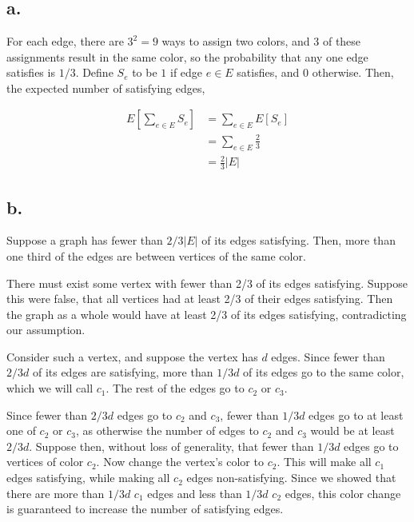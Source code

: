 \documentclass[11pt]{article}
\begin{document}
\section{}
\subsection*{a.}
For each edge, there are $3^2 = 9$ ways to assign two colors, and 3 of these assignments result in the same color, so the probability that any one edge satisfies is $1/3$. Define $S_e$ to be $1$ if edge $e \in E$ satisfies, and $0$ otherwise. Then, the expected number of satisfying edges, 

\begin{align*}
    E\left[ \sum_{e \in E} S_e\right] &= \sum_{e \in E} E[S_e]  \\
    &= \sum_{e\in E} \frac{2}{3}  \\
    &= \frac{2}{3}|E|
\end{align*}

\subsection*{b.}
Suppose a graph has fewer than $2/3|E|$ of its edges satisfying. Then, more than one third of the edges are between vertices of the same color.

There must exist some vertex with fewer than 2/3 of its edges satisfying. Suppose this were false, that all vertices had at least 2/3 of their edges satisfying. Then the graph as a whole would have at least 2/3 of its edges satisfying, contradicting our assumption. 

Consider such a vertex, and suppose the vertex has $d$ edges. Since fewer than $2/3d$ of its edges are satisfying, more than $1/3d$ of its edges go to the same color, which we will call $c_1$. The rest of the edges go to $c_2$ or $c_3$.

Since fewer than $2/3d$ edges go to $c_2$ and $c_3$, fewer than $1/3d$ edges go to at least one of $c_2$ or $c_3$, as otherwise the number of edges to $c_2$ and $c_3$ would be at least $2/3d$. Suppose then, without loss of generality, that fewer than $1/3d$ edges go to vertices of color $c_2$. Now change the vertex's color to $c_2$. This will make all $c_1$ edges satisfying, while making all $c_2$ edges non-satisfying. Since we showed that there are more than $1/3d$ $c_1$ edges and less than $1/3d$ $c_2$ edges, this color change is guaranteed to increase the number of satisfying edges.
\end{document}
